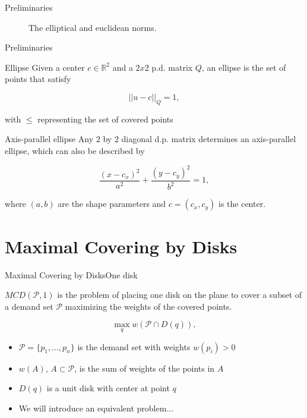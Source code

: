 \documentclass{beamer}
\newcommand{\R}{\mathbb{R}}
\newcommand{\Pp}{\mathscr{P}}
\begin{document}
\begin{frame}{Preliminaries}
	\begin{figure}[H]
		\centering
		
		\caption{The elliptical and euclidean norms.}
		
		\label{fig:3ellipses_intersect}
	\end{figure}
\end{frame}

\begin{frame}{Preliminaries}
	
	\begin{block}{Ellipse}
		Given a center $c \in \R^2$ and a $2x2$ p.d. matrix $Q$, an ellipse is the set of points that satisfy
		
		\begin{equation*}
		||u-c||_Q = 1,
		\end{equation*}
		
		with $\le$ representing the set of covered points
	\end{block}

	\begin{block}{Axis-parallel ellipse}
		Any $2$ by $2$ diagonal d.p. matrix determines an axis-parallel ellipse, which can also be described by
		
		\begin{equation*}
		\frac{(x-c_x)^2}{a^2} + \frac{(y-c_y)^2}{b^2} = 1,
		\end{equation*}
		
		where $(a,b)$ are the shape parameters and $c=(c_x,c_y)$ is the center.
	\end{block}

\end{frame}



\section{Maximal Covering by Disks}
\begin{frame}{Maximal Covering by Disks}{One disk}
	
	$MCD(\Pp, 1)$ is the problem of placing one disk on the plane to cover a subset of a demand set $\Pp$ maximizing the weights of the covered points.
	
	\begin{equation*}\label{eq:max_one_disk}
		\max_q w(\Pp \cap D(q)),
	\end{equation*}
	
	\begin{itemize}
		\item $\Pp=\{p_1,\dots,p_n\}$ is the demand set with weights $w(p_i)>0$
		\item $w(A)$, $A\subset \Pp$, is the sum of weights of the points in $A$
		\item $D(q)$ is a unit disk with center at point $q$
		\item We will introduce an equivalent problem...
	\end{itemize}
\end{frame}
\end{document}

